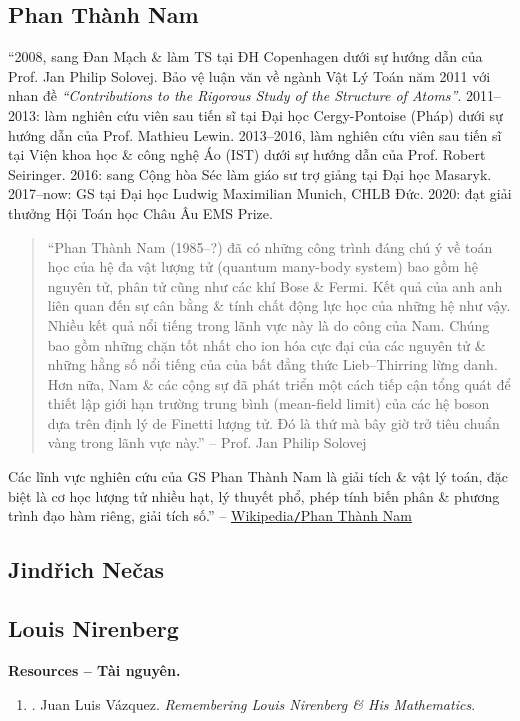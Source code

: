 \documentclass{article}
\begin{document}
\subsection{Phan Thành Nam}
``2008, sang Đan Mạch \& làm TS tại ĐH Copenhagen dưới sự hướng dẫn của Prof. {\sc Jan Philip Solovej}. Bảo vệ luận văn về ngành Vật Lý Toán năm 2011 với nhan đề {\it``Contributions to the Rigorous Study of the Structure of Atoms''}. 2011--2013: làm nghiên cứu viên sau tiến sĩ tại Đại học Cergy-Pontoise (Pháp) dưới sự hướng dẫn của Prof. {\sc Mathieu Lewin}. 2013--2016,  làm nghiên cứu viên sau tiến sĩ tại Viện khoa học \& công nghệ Áo (IST) dưới sự hướng dẫn của Prof. {\sc Robert Seiringer}. 2016: sang Cộng hòa Séc làm giáo sư trợ giảng tại Đại học Masaryk. 2017--now: GS tại Đại học Ludwig Maximilian Munich, CHLB Đức. 2020: đạt giải thưởng Hội Toán học Châu Âu EMS Prize.
\begin{quotation}
	``{\sc Phan Thành Nam} (1985--?) đã có những công trình đáng chú ý về toán học của hệ đa vật lượng tử (quantum many-body system) bao gồm hệ nguyên tử, phân tử cũng như các khí Bose \& Fermi. Kết quả của anh anh liên quan đến sự cân bằng \& tính chất động lực học của những hệ như vậy. Nhiều kết quả nổi tiếng trong lãnh vực này là do công của Nam. Chúng bao gồm những chặn tốt nhất cho ion hóa cực đại của các nguyên tử \& những hằng số nổi tiếng của của bất đẳng thức Lieb--Thirring lừng danh. Hơn nữa, Nam \& các cộng sự đã phát triển một cách tiếp cận tổng quát để thiết lập giới hạn trường trung bình (mean-field limit) của các hệ boson dựa trên định lý de Finetti lượng tử. Đó là thứ mà bây giờ trở tiêu chuẩn vàng trong lãnh vực này.'' -- Prof. {\sc Jan Philip Solovej}
\end{quotation}
Các lĩnh vực nghiên cứu của GS Phan Thành Nam là giải tích \& vật lý toán, đặc biệt là cơ học lượng tử nhiều hạt, lý thuyết phổ, phép tính biến phân \& phương trình đạo hàm riêng, giải tích số.'' -- \href{https://vi.wikipedia.org/wiki/Phan_Th%C3%A0nh_Nam}{Wikipedia{\tt/}Phan Thành Nam}


\subsection{Jind\v{r}ich Ne\v{c}as}


\subsection{Louis Nirenberg}
\textbf{\textsf{Resources -- Tài nguyên.}}
\begin{enumerate}
	\item \cite{Vazquez_remember_Nirenberg}. {\sc Juan Luis V\'{a}zquez}. {\it Remembering Louis Nirenberg \& His Mathematics}.
\end{enumerate}
\end{document}
